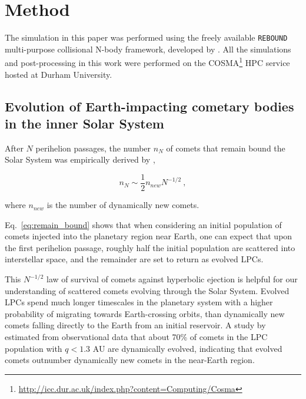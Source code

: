 \chapter{Method}
\label{chap:method}


The simulation in this paper was performed using the freely available \texttt{REBOUND} multi-purpose collisional N-body framework, developed by \cite{2012A&A...537A.128R}. All the simulations and post-processing in this work were performed on the COSMA\footnote{\url{http://icc.dur.ac.uk/index.php?content=Computing/Cosma}} HPC service hosted at Durham University.
\section{Evolution of Earth-impacting cometary bodies in the inner Solar System}
\label{method:evol}
After $N$ perihelion passages, the number $n_N$ of comets that remain bound the Solar System was empirically derived by \citep{1976NASSP.393..445E},

\vspace{-1ex}
\begin{equation}
    n_N \sim \dfrac{1}{2}n_{new}N^{-1/2}~,
    \label{eq:remain_bound}
\end{equation}

where $n_{new}$ is the number of dynamically new comets.

Eq.~\eqref{eq:remain_bound} shows that when considering an initial population of comets injected into the planetary region near Earth, one can expect that upon the first perihelion passage, roughly half the initial population are scattered into interstellar space, and the remainder are set to return as evolved LPCs.

This $N^{-1/2}$ law of survival of comets against hyperbolic ejection is helpful for our understanding of scattered comets evolving through the Solar System. Evolved LPCs spend much longer timescales in the planetary system with a higher probability of migrating towards Earth-crossing orbits, than dynamically new comets falling directly to the Earth from an initial reservoir. A study by \cite{2012MNRAS.423.1674F} estimated from observational data that about 70\% of comets in the LPC population with $q < 1.3$ AU are dynamically evolved, indicating that evolved comets outnumber dynamically new comets in the near-Earth region. 

